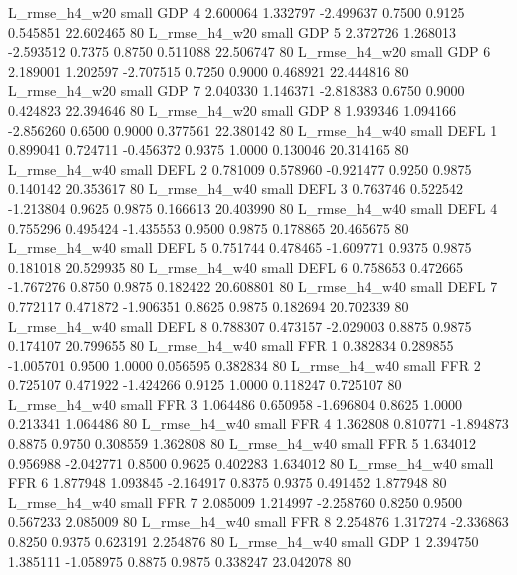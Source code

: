  L_rmse_h4_w20      small      GDP                 4 2.600064 1.332797 -2.499637 0.7500 0.9125  0.545851   22.602465 80
 L_rmse_h4_w20      small      GDP                 5 2.372726 1.268013 -2.593512 0.7375 0.8750  0.511088   22.506747 80
 L_rmse_h4_w20      small      GDP                 6 2.189001 1.202597 -2.707515 0.7250 0.9000  0.468921   22.444816 80
 L_rmse_h4_w20      small      GDP                 7 2.040330 1.146371 -2.818383 0.6750 0.9000  0.424823   22.394646 80
 L_rmse_h4_w20      small      GDP                 8 1.939346 1.094166 -2.856260 0.6500 0.9000  0.377561   22.380142 80
 L_rmse_h4_w40      small     DEFL                 1 0.899041 0.724711 -0.456372 0.9375 1.0000  0.130046   20.314165 80
 L_rmse_h4_w40      small     DEFL                 2 0.781009 0.578960 -0.921477 0.9250 0.9875  0.140142   20.353617 80
 L_rmse_h4_w40      small     DEFL                 3 0.763746 0.522542 -1.213804 0.9625 0.9875  0.166613   20.403990 80
 L_rmse_h4_w40      small     DEFL                 4 0.755296 0.495424 -1.435553 0.9500 0.9875  0.178865   20.465675 80
 L_rmse_h4_w40      small     DEFL                 5 0.751744 0.478465 -1.609771 0.9375 0.9875  0.181018   20.529935 80
 L_rmse_h4_w40      small     DEFL                 6 0.758653 0.472665 -1.767276 0.8750 0.9875  0.182422   20.608801 80
 L_rmse_h4_w40      small     DEFL                 7 0.772117 0.471872 -1.906351 0.8625 0.9875  0.182694   20.702339 80
 L_rmse_h4_w40      small     DEFL                 8 0.788307 0.473157 -2.029003 0.8875 0.9875  0.174107   20.799655 80
 L_rmse_h4_w40      small      FFR                 1 0.382834 0.289855 -1.005701 0.9500 1.0000  0.056595    0.382834 80
 L_rmse_h4_w40      small      FFR                 2 0.725107 0.471922 -1.424266 0.9125 1.0000  0.118247    0.725107 80
 L_rmse_h4_w40      small      FFR                 3 1.064486 0.650958 -1.696804 0.8625 1.0000  0.213341    1.064486 80
 L_rmse_h4_w40      small      FFR                 4 1.362808 0.810771 -1.894873 0.8875 0.9750  0.308559    1.362808 80
 L_rmse_h4_w40      small      FFR                 5 1.634012 0.956988 -2.042771 0.8500 0.9625  0.402283    1.634012 80
 L_rmse_h4_w40      small      FFR                 6 1.877948 1.093845 -2.164917 0.8375 0.9375  0.491452    1.877948 80
 L_rmse_h4_w40      small      FFR                 7 2.085009 1.214997 -2.258760 0.8250 0.9500  0.567233    2.085009 80
 L_rmse_h4_w40      small      FFR                 8 2.254876 1.317274 -2.336863 0.8250 0.9375  0.623191    2.254876 80
 L_rmse_h4_w40      small      GDP                 1 2.394750 1.385111 -1.058975 0.8875 0.9875  0.338247   23.042078 80
